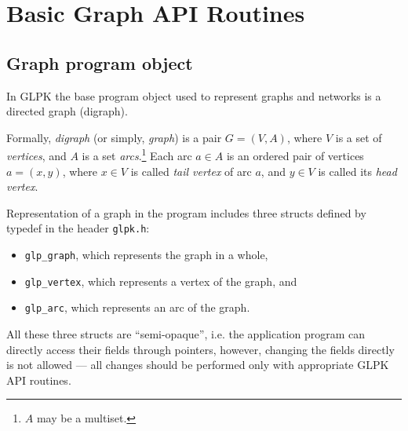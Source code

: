 \documentclass[11pt]{report}
\begin{document}

\newpage

{\setlength{\parskip}{0pt}
\tableofcontents
}


\chapter{Basic Graph API Routines}

\section{Graph program object}

In GLPK the base program object used to represent graphs and networks
is a directed graph (digraph).

Formally, {\it digraph} (or simply, {\it graph}) is a pair $G=(V,A)$,
where $V$ is a set of {\it vertices}, and $A$ is a set
{\it arcs}.\footnote{$A$ may be a multiset.} Each arc $a\in A$ is an
ordered pair of vertices $a=(x,y)$, where $x\in V$ is called {\it tail
vertex} of arc $a$, and $y\in V$ is called its {\it head vertex}.

Representation of a graph in the program includes three structs defined
by typedef in the header \verb|glpk.h|:

\vspace*{-8pt}

\begin{itemize}
\item \verb|glp_graph|, which represents the graph in a whole,

\item \verb|glp_vertex|, which represents a vertex of the graph, and

\item \verb|glp_arc|, which represents an arc of the graph.
\end{itemize}

\vspace*{-8pt}

All these three structs are ``semi-opaque'', i.e. the application
program can directly access their fields through pointers, however,
changing the fields directly is not allowed --- all changes should be
performed only with appropriate GLPK API routines.

\newenvironment{comment}
{\addtolength{\leftskip}{16pt}\noindent}
{\par\addtolength{\leftskip}{-16pt}}
\end{document}
